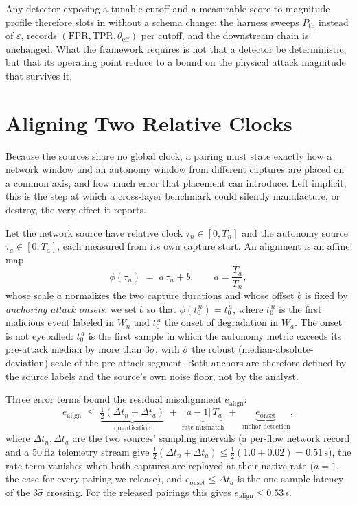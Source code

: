 Any detector exposing a tunable cutoff and a measurable score-to-magnitude
profile therefore slots in without a schema change: the harness sweeps
$P_{\mathrm{th}}$ instead of $\varepsilon$, records
$(\mathrm{FPR},\mathrm{TPR},\theta_{\mathrm{eff}})$ per cutoff, and the
downstream chain is unchanged. What the framework requires is not that a
detector be deterministic, but that its operating point reduce to a bound on the
physical attack magnitude that survives it.

\section{Aligning Two Relative Clocks}
\label{app:alignment}
Because the sources share no global clock, a  pairing
must state exactly how a network window and an autonomy window from different
captures are placed on a common axis, and how much error that placement can
introduce. Left implicit, this is the step at which a cross-layer benchmark
could silently manufacture, or destroy, the very effect it reports.

Let the network source have relative clock $\tau_n\in[0,T_n]$ and the autonomy
source $\tau_a\in[0,T_a]$, each measured from its own capture start. An
alignment is an affine map
\begin{equation}
\label{eq:align}
\phi(\tau_n) \;=\; a\,\tau_n + b, \qquad a=\frac{T_a}{T_n},
\end{equation}
whose scale $a$ normalizes the two capture durations and whose offset $b$ is
fixed by \emph{anchoring attack onsets}: we set $b$ so that
$\phi(t_0^{\,n}) = t_0^{\,a}$, where $t_0^{\,n}$ is the first malicious event labeled in $W_n$ and $t_0^{\,a}$ the onset of degradation in $W_a$. The onset is not eyeballed: $t_0^{\,a}$ is the first sample in which the autonomy metric exceeds
its pre-attack median by more than $3\hat\sigma$, with $\hat\sigma$ the robust
(median-absolute-deviation) scale of the pre-attack segment. Both anchors are
therefore defined by the source labels and the source's own noise floor, not by
the analyst.

Three error terms bound the residual misalignment $e_{\mathrm{align}}$:
\begin{equation}
\label{eq:align_err}
e_{\mathrm{align}} \;\le\; \underbrace{\tfrac{1}{2}(\Delta t_n+\Delta t_a)}_{\text{quantisation}}
\;+\;\underbrace{|a-1|\,T_a}_{\text{rate mismatch}}
\;+\;\underbrace{e_{\mathrm{onset}}}_{\text{anchor detection}},
\end{equation}
where $\Delta t_n,\Delta t_a$ are the two sources' sampling intervals (a per-flow
network record and a $50$\,Hz telemetry stream give
$\tfrac12(\Delta t_n+\Delta t_a)\le\tfrac12(1.0+0.02)=0.51$\,s), the rate term
vanishes when both captures are replayed at their native rate ($a=1$, the case
for every pairing we release), and $e_{\mathrm{onset}}\le\Delta t_a$ is the
one-sample latency of the $3\hat\sigma$ crossing. For the released
 pairings this gives
$e_{\mathrm{align}}\le0.53$\,s.

